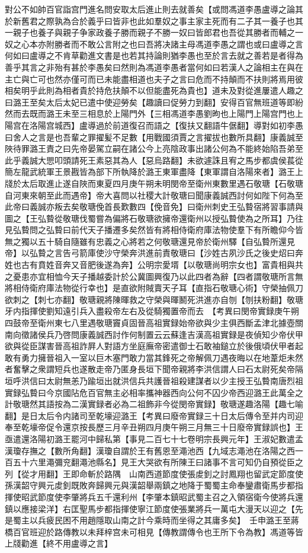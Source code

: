 對公不如帥百官詣宫門進名問安取太后進止則去就善矣【或問馮道李愚盧導之論其於新舊君之際孰為合於義乎曰皆非也此如羣奴之事主家主死而有二子其一養子也其一親子也養子與親子争家政養子勝而親子不勝一奴曰皆郎君也吾從其勝者而輔之一奴之心本亦附勝者而不敢公言附之也曰吾將决諸主母馮道李愚之謂也或曰盧導之言何如曰盧導之不肯草勸進文書是也若其持論則猶李愚也至於言去就之善若是者得為善乎其言之非殆有甚於李愚矣曰然則為馮道李愚者當何如曰若漢人之論相主在與在主亡與亡可也然亦僅可而已未能盡相道也夫子之言曰危而不持顛而不扶則將焉用彼相矣明乎此則為相者貴於持危扶顛不以但能盡死為貴也】道未及對從進屢遣人趣之曰潞王至矣太后太妃已遣中使迎勞矣【趣讀曰促勞力到翻】安得百官無班道等即紛然而去既而潞王未至三相息於上陽門外【三相馮道李愚劉昫也上陽門上陽宫門也上陽宫在洛陽宫城西】盧導過於前道復召而語之【復扶又翻語牛倨翻】導對如初李愚曰舍人之言是也吾輩之罪擢髪不足數【用戰國須賈之言擢拔也數所具翻】康義誠至陜待罪潞王責之曰先帝晏駕立嗣在諸公今上亮陰政事出諸公何為不能終始陷吾弟至此乎義誠大愳叩頭請死王素惡其為人【惡烏路翻】未欲遽誅且宥之馬步都虞侯萇從簡左龍武統軍王景戡皆為部下所執降於潞王東軍盡降【東軍謂自洛陽來者】潞王上牋於太后取進止遂自陜而東夏四月庚午朔未明閔帝至衛州東數里遇石敬瑭【石敬瑭自河東來朝至此而遇帝】帝大喜問以社稷大計敬瑭曰聞康義誠西討何如陛下何為至此帝曰義誠亦叛去矣敬瑭俛首長歎數四【俛音免】曰衛州刺史王弘䞇宿將習事請與圖之【王弘䞇從敬瑭伐蜀嘗為偏將石敬瑭欲擁帝還衛州以授弘䞇使為之所耳】乃往見弘䞇問之弘䞇曰前代天子播遷多矣然皆有將相侍衛府庫法物使羣下有所瞻仰今皆無之獨以五十騎自隨雖有忠義之心將若之何敬瑭還見帝於衛州驛【自弘䞇所還見帝】以弘䞇之言告弓箭庫使沙守榮奔洪進前責敬瑭曰【沙姓古夙沙氏之後史炤曰奔姓也古有賁姓音奔又音肥後遂為奔】公明宗愛壻【以敬瑭尚明宗女也】富貴相與共之憂患亦宜相恤今天子播越委計於公冀圖興復乃以此四者為辭【四者謂敬瑭所言無將相侍衛府庫法物從行幸也】是直欲附賊賣天子耳【直指石敬瑭心術】守榮抽佩刀欲刺之【刺七亦翻】敬瑭親將陳暉救之守榮與暉鬭死洪進亦自刎【刎扶粉翻】敬瑭牙内指揮使劉知遠引兵入盡殺帝左右及從騎獨置帝而去　【考異曰閔帝實録庚午朔四鼓帝至衛州東七八里遇敬瑭竇貞固晉高祖實録始帝欲與少主俱西斷孟津北據壺關南向徵諸侯兵乃啓問康義誠西討作何制置云云蘇逢吉漢高祖實録是夜偵知少帝伏甲欲與從臣謀害晉高祖詐屛人對語方坐庭廡帝密遣御士石敢袖鎚立於後俄頃伏甲者起敢有勇力擁晉祖入一室以巨木塞門敢力當其鋒死之帝解佩刀遇夜晦以在地葦炬未然者奮擊之衆謂短兵也遂散走帝乃匿身長垣下聞帝親將李洪信謂人曰石太尉死矣帝隔垣呼洪信曰太尉無恙乃踰垣出就洪信兵共護晉祖殺建謀者以少主授王弘䞇南唐烈祖實録弘䞇曰今京國阽危百官無主必相率攜神器西向公何不囚少帝西迎潞王此萬全之計敬瑭然其語按為二漢實録者必為二祖飾非今從閔帝實録】敬瑭遂趣洛陽【趣七喻翻】是日太后令内諸司至乾壕迎潞王【考異曰廢帝實録三十日太后傳令至并内司迎奉至乾壕帝促令還京按長歷三月辛丑朔四月庚午朔三月無三十日廢帝實録誤也】王亟遣還洛陽初潞王罷河中歸私第【事見二百七十七卷明宗長興元年】王淑妃數遣孟漢瓊存撫之【數所角翻】漢瓊自謂於王有舊恩至澠池西【九域志澠池在洛陽之西一百五十六里澠彌兖翻澠池縣名】見王大哭欲有所陳王曰諸事不言可知仍自預從臣之列【從才用翻】王即命斬於路隅　山南西道節度使張䖍釗之討鳳翔也留武定節度使孫漢韶守興元䖍釗既敗奔歸興元與漢韶舉兩鎮之地降于蜀蜀主命奉鑾肅衛馬步都指揮使昭武節度使李肇將兵五千還利州【李肇本鎮昭武蜀主召之入領宿衛今使將兵還鎮以應接梁洋】右匡聖馬步都指揮使寧江節度使張業將兵一萬屯大漫天以迎之【先是蜀主以兵疲民困不用趙隱取山南之計今乘時而坐得之其庸多矣】　壬申潞王至蔣橋百官班迎於路傳教以未拜梓宫未可相見【傳教謂傳令也王所下令為教】馮道等皆上牋勸進【終不用盧導之言】